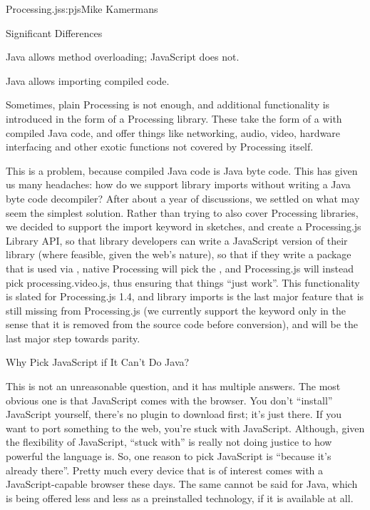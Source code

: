 \begin{aosachapter}{Processing.js}{s:pjs}{Mike Kamermans}
\begin{aosasect1}{Significant Differences}
\begin{aosasect3}{Java allows method overloading; JavaScript does not.}
\end{aosasect3}

\begin{aosasect3}{Java allows importing compiled code.}

Sometimes, plain Processing is not enough, and additional
functionality is introduced in the form of a Processing library. These
take the form of a  with compiled Java code, and offer
things like networking, audio, video, hardware interfacing and other
exotic functions not covered by Processing itself.

This is a problem, because compiled Java code is Java byte code. This
has given us many headaches: how do we support library imports without
writing a Java byte code decompiler? After about a year of
discussions, we settled on what may seem the simplest solution. Rather
than trying to also cover Processing libraries, we decided to support
the import keyword in sketches, and create a Processing.js Library
API, so that library developers can write a JavaScript version of
their library (where feasible, given the web's nature), so that if
they write a package that is used via ,
native Processing will pick the , and Processing.js
will instead pick processing.video.js, thus ensuring that things
``just work''. This functionality is slated for Processing.js 1.4, and
library imports is the last major feature that is still missing from
Processing.js (we currently support the  keyword only in the
sense that it is removed from the source code before conversion), and
will be the last major step towards parity.

\end{aosasect3}

\begin{aosasect2}{Why Pick JavaScript if It Can't Do Java?}

This is not an unreasonable question, and it has multiple answers. The
most obvious one is that JavaScript comes with the browser. You don't
``install'' JavaScript yourself, there's no plugin to download first;
it's just there. If you want to port something to the web, you're
stuck with JavaScript. Although, given the flexibility of JavaScript,
``stuck with'' is really not doing justice to how powerful the language
is. So, one reason to pick JavaScript is ``because it's already
there''. Pretty much every device that is of interest comes with a
JavaScript-capable browser these days. The same cannot be said for
Java, which is being offered less and less as a preinstalled
technology, if it is available at all.


\end{aosasect2}
\end{aosasect1}
\end{aosachapter}

